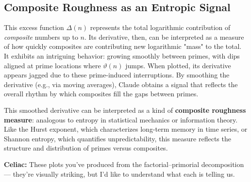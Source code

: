 % 
% 
% 
% 
\subsection*{Composite Roughness as an Entropic Signal}

This excess function $\Delta(n)$ represents the total logarithmic contribution of \emph{composite} numbers up to $n$. Its derivative, then, can be interpreted as a measure of how quickly composites are contributing new logarithmic "mass" to the total. It exhibits an intriguing behavior: growing smoothly between primes, with dips aligned at prime locations where $\vartheta(n)$ jumps. When plotted, its derivative appears jagged due to these prime-induced interruptions. By smoothing the derivative (e.g., via moving averages), Claude obtains a signal that reflects the overall rhythm by which composites fill the gaps between primes.

This smoothed derivative can be interpreted as a kind of \textbf{composite roughness measure}: analogous to entropy in statistical mechanics or information theory. Like the Hurst exponent, which characterizes long-term memory in time series, or Shannon entropy, which quantifies unpredictability, this measure reflects the structure and distribution of primes versus composites.

\begin{center}
\decofourleft \quad \decofourright
\end{center}

\textbf{Celiac:} These plots you’ve produced from the factorial–primorial decomposition — they’re visually striking, but I’d like to understand what each is telling us.

